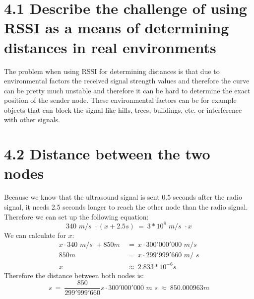 \documentclass{article}
\begin{document}
	\pagestyle{fancy}
	\hfill
	
	\section*{4.1 Describe the challenge of using RSSI as a means of determining distances in real environments}
	\begin{adjustwidth}{2em}{2em}
		The problem when using RSSI for determining distances is that due to environmental factors the received signal strength values and therefore the curve can be pretty much unstable and therefore it can be hard to determine the exact position of the sender node. These environmental factors can be for example objects that can block the signal like hills, trees, buildings, etc. or interference with other signals.
	\end{adjustwidth}
	
	\section*{4.2 Distance between the two nodes}
	\begin{adjustwidth}{2em}{2em}
		Because we know that the ultrasound signal is sent 0.5 seconds after the radio signal, it needs 2.5 seconds longer to reach the other node than the radio signal. Therefore we can set up the following equation:
		\[
			340 \textit{ m/s } \cdot (x + 2.5s) \ = \ 3 * 10^8 \textit{ m/s } \cdot x
		\]
		We can calculate for $x$:
		\begin{align*}
			x \cdot 340 \textit{ m/s } + 850m \ & = \ x \cdot 300'000'000 \textit{ m/s } \\
			850m \ & = \ x \cdot 299'999'660 \textit{ m/ s} \\
			x \ & \approx \ 2.833 * 10^{-6}s
		\end{align*}
		Therefore the distance between both nodes is:
		\[
			s \ = \ \frac{850}{299'999'660}s \cdot 300'000'000 \textit{ m\ s} \ \approx \ 850.000963 m
		\]
	\end{adjustwidth}
\end{document}
